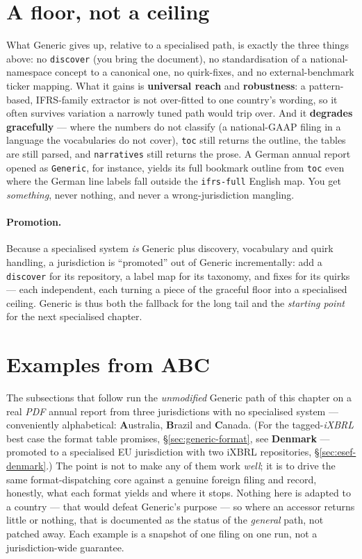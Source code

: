 \documentclass[11pt,a4paper]{report}
\begin{document}
\section{A floor, not a ceiling}
\label{sec:generic-floor}

What Generic gives up, relative to a specialised path, is exactly the three things above: no \texttt{discover}
(you bring the document), no standardisation of a national-namespace concept to a canonical one, no
quirk-fixes, and no external-benchmark ticker mapping. What it gains is \textbf{universal reach} and
\textbf{robustness}: a pattern-based, IFRS-family extractor is not over-fitted to one country's wording, so it
often survives variation a narrowly tuned path would trip over. And it \textbf{degrades gracefully} --- where
the numbers do not classify (a national-GAAP filing in a language the vocabularies do not cover),
\texttt{toc} still returns the outline, the tables are still parsed, and \texttt{narratives} still returns the
prose. A German annual report opened as \texttt{Generic}, for instance, yields its full bookmark outline from
\texttt{toc} even where the German line labels fall outside the \texttt{ifrs-full} English map. You get
\emph{something}, never nothing, and never a wrong-jurisdiction mangling.

\paragraph{Promotion.} Because a specialised system \emph{is} Generic plus discovery, vocabulary and quirk
handling, a jurisdiction is ``promoted'' out of Generic incrementally: add a \texttt{discover} for its
repository, a label map for its taxonomy, and fixes for its quirks --- each independent, each turning a piece
of the graceful floor into a specialised ceiling. Generic is thus both the fallback for the long tail and the
\emph{starting point} for the next specialised chapter.

\section{Examples from ABC}
\label{sec:generic-examples}

The subsections that follow run the \emph{unmodified} Generic path of this chapter on a real \emph{PDF} annual
report from three jurisdictions with no specialised system --- conveniently alphabetical: \textbf{A}ustralia,
\textbf{B}razil and \textbf{C}anada. (For the tagged-\emph{iXBRL} best case the format table promises,
\S\ref{sec:generic-format}, see \textbf{Denmark} --- promoted to a specialised EU jurisdiction with two iXBRL
repositories, \S\ref{sec:esef-denmark}.) The point is not to make any of them work \emph{well}; it is to drive
the same format-dispatching core against a genuine foreign filing and record, honestly, what each format yields
and where it stops. Nothing here is adapted to a country --- that would defeat Generic's purpose --- so where
an accessor returns little or nothing, that is documented as the status of the \emph{general} path, not patched
away. Each example is a snapshot of one filing on one run, not a jurisdiction-wide guarantee.
\end{document}
